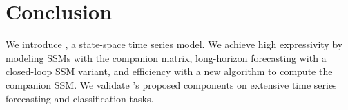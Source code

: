 \section{Conclusion}

We introduce \ourmethod{}, a state-space time series model. We achieve high expressivity by modeling SSMs with the companion matrix, long-horizon forecasting with a closed-loop SSM variant, and efficiency with a new algorithm to compute the companion SSM. We validate \ourmethod{}'s proposed components on extensive time series forecasting and classification tasks.
